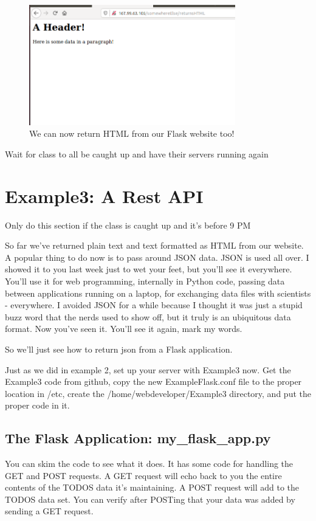 \documentclass[10pt]{article}
\begin{document}
\begin{figure}[h]
  \centering
    \includegraphics[width=0.8\textwidth]{somewhereElse_returnsHTML.png}
  \caption{We can now return HTML from our Flask website too!}
\end{figure}

{\LARGE Wait for class to all be caught up and have their servers running again}

\section{Example3: A Rest API}
{\LARGE Only do this section if the class is caught up and it's before 9 PM}

So far we've returned plain text and text formatted as HTML from our website. A popular thing to do now is to pass around JSON data. JSON is used all over. I showed it to you last week just to wet your feet, but you'll see it everywhere. You'll use it for web programming, internally in Python code, passing data between applications running on a laptop, for exchanging data files with scientists - everywhere. I avoided JSON for a while because I thought it was just a stupid buzz word that the nerds used to show off, but it truly is an ubiquitous data format. Now you've seen it. You'll see it again, mark my words. 

So we'll just see how to return json from a Flask application.

Just as we did in example 2, set up your server with Example3 now. Get the Example3 code from github, copy the new ExampleFlask.conf file to the proper location in /etc, create the /home/webdeveloper/Example3 directory, and put the proper code in it. 

\subsection{The Flask Application: my\_flask\_app.py}
You can skim the code to see what it does. It has some code for handling the GET and POST requests. A GET request will echo back to you the entire contents of the TODOS data it's maintaining. A POST request will add to the TODOS data set. You can verify after POSTing that your data was added by sending a GET request.
\end{document}
